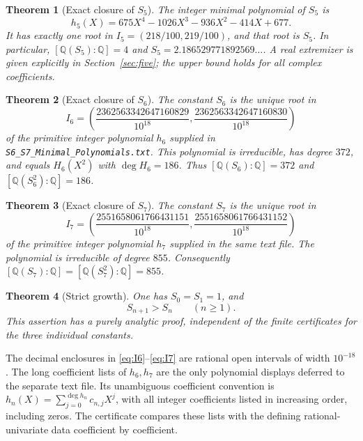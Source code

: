 \documentclass[11pt]{article}
\newtheorem{theorem}{Theorem}[section]
\begin{document}
\begin{theorem}[Exact closure of $S_5$]\label{thm:main}
The integer minimal polynomial of $S_5$ is
\begin{equation}\label{eq:Lambda-polynomial}
 h_5(X)=675X^4-1026X^3-936X^2-414X+677.
\end{equation}
It has exactly one root in $I_5=(218/100,219/100)$, and that root is $S_5$.
In particular, $[\mathbb Q(S_5):\mathbb Q]=4$ and
$S_5=2.186529771892569\ldots$. A real extremizer is given explicitly in
Section~\ref{sec:five}; the upper bound holds for all complex coefficients.
\end{theorem}

\begin{theorem}[Exact closure of $S_6$]\label{thm:main6}
The constant $S_6$ is the unique root in
\begin{equation}\label{eq:I6}
 I_6=\left(\frac{2362563342647160829}{10^{18}},
                \frac{2362563342647160830}{10^{18}}\right)
\end{equation}
of the primitive integer polynomial $h_6$ supplied in
\texttt{S6\_S7\_Minimal\_Polynomials.txt}. This polynomial is irreducible,
has degree $372$, and equals $H_6(X^2)$ with $\deg H_6=186$.
Thus $[\mathbb Q(S_6):\mathbb Q]=372$ and
$[\mathbb Q(S_6^2):\mathbb Q]=186$.
\end{theorem}

\begin{theorem}[Exact closure of $S_7$]\label{thm:main7}
The constant $S_7$ is the unique root in
\begin{equation}\label{eq:I7}
 I_7=\left(\frac{2551658061766431151}{10^{18}},
                \frac{2551658061766431152}{10^{18}}\right)
\end{equation}
of the primitive integer polynomial $h_7$ supplied in the same text file.
The polynomial is irreducible of degree $855$. Consequently
$[\mathbb Q(S_7):\mathbb Q]=[\mathbb Q(S_7^2):\mathbb Q]=855$.
\end{theorem}

\begin{theorem}[Strict growth]\label{thm:monotonicity}
One has $S_0=S_1=1$, and
\begin{equation}\label{eq:strictgrowth}
 S_{n+1}>S_n\qquad(n\ge1).
\end{equation}
This assertion has a purely analytic proof, independent of the finite
certificates for the three individual constants.
\end{theorem}

The decimal enclosures in \eqref{eq:I6}--\eqref{eq:I7} are rational open
intervals of width $10^{-18}$. The long coefficient lists of $h_6,h_7$ are
the only polynomial displays deferred to the separate text file. Its
unambiguous coefficient convention is
$h_n(X)=\sum_{j=0}^{\deg h_n}c_{n,j}X^j$, with all integer coefficients
listed in increasing order, including zeros. The certificate compares these
lists with the defining rational-univariate data coefficient by coefficient.
\end{document}
